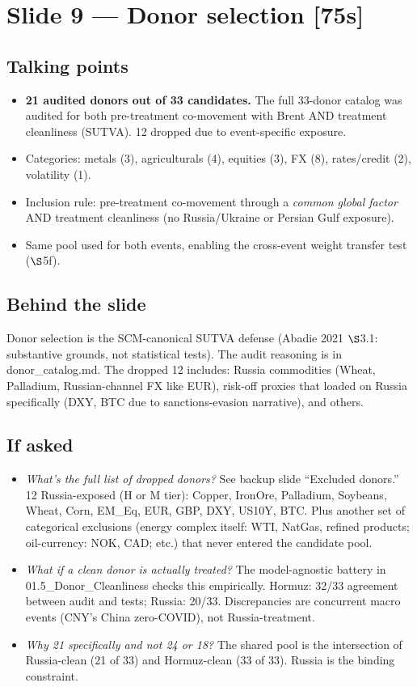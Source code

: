 \documentclass[11pt,a4paper]{article}
\newcommand{\timetag}[1]{\hfill\textcolor{muted}{\small[#1]}}
\newcommand{\highlight}[1]{\textcolor{accent}{\textbf{#1}}}
\begin{document}
\section{Slide 9 --- Donor selection \timetag{75s}}

\subsection{Talking points}
\begin{itemize}
  \item \highlight{21 audited donors out of 33 candidates.} The full 33-donor catalog was audited for both pre-treatment co-movement with Brent AND treatment cleanliness (SUTVA). 12 dropped due to event-specific exposure.
  \item Categories: metals (3), agriculturals (4), equities (3), FX (8), rates/credit (2), volatility (1).
  \item Inclusion rule: pre-treatment co-movement through a \emph{common global factor} AND treatment cleanliness (no Russia/Ukraine or Persian Gulf exposure).
  \item Same pool used for both events, enabling the cross-event weight transfer test ($\S$5f).
\end{itemize}

\subsection{Behind the slide}
Donor selection is the SCM-canonical SUTVA defense (Abadie 2021 $\S$3.1: substantive grounds, not statistical tests). The audit reasoning is in donor\_catalog.md. The dropped 12 includes: Russia commodities (Wheat, Palladium, Russian-channel FX like EUR), risk-off proxies that loaded on Russia specifically (DXY, BTC due to sanctions-evasion narrative), and others.

\subsection{If asked}
\begin{itemize}
  \item \textit{What's the full list of dropped donors?} See backup slide ``Excluded donors.'' 12 Russia-exposed (H or M tier): Copper, IronOre, Palladium, Soybeans, Wheat, Corn, EM\_Eq, EUR, GBP, DXY, US10Y, BTC. Plus another set of categorical exclusions (energy complex itself: WTI, NatGas, refined products; oil-currency: NOK, CAD; etc.) that never entered the candidate pool.
  \item \textit{What if a clean donor is actually treated?} The model-agnostic battery in 01.5\_Donor\_Cleanliness checks this empirically. Hormuz: 32/33 agreement between audit and tests; Russia: 20/33. Discrepancies are concurrent macro events (CNY's China zero-COVID), not Russia-treatment.
  \item \textit{Why 21 specifically and not 24 or 18?} The shared pool is the intersection of Russia-clean (21 of 33) and Hormuz-clean (33 of 33). Russia is the binding constraint.
\end{itemize}
\end{document}
